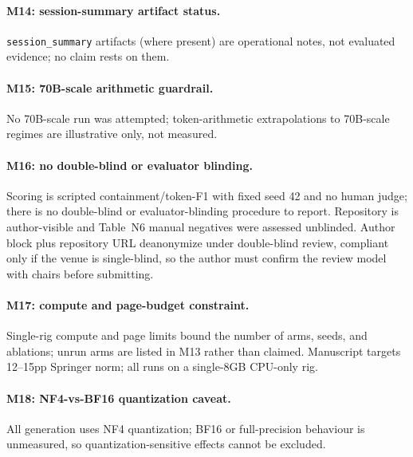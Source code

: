 \paragraph{M14: session-summary artifact status.}
\texttt{session\_summary} artifacts (where present) are operational notes, not evaluated evidence; no claim rests on them.

\paragraph{M15: 70B-scale arithmetic guardrail.}
No 70B-scale run was attempted; token-arithmetic extrapolations to 70B-scale regimes are illustrative only, not measured.

\paragraph{M16: no double-blind or evaluator blinding.}
Scoring is scripted containment/token-F1 with fixed seed 42 and no human judge; there is no double-blind or evaluator-blinding procedure to report.
Repository is author-visible and Table~N6 manual negatives were assessed unblinded.
Author block plus repository URL deanonymize under double-blind review, compliant only if the venue is single-blind, so the author must confirm the review model with chairs before submitting.

\paragraph{M17: compute and page-budget constraint.}
Single-rig compute and page limits bound the number of arms, seeds, and ablations; unrun arms are listed in M13 rather than claimed.
Manuscript targets 12--15pp Springer norm; all runs on a single-8GB CPU-only rig.

\paragraph{M18: NF4-vs-BF16 quantization caveat.}
All generation uses NF4 quantization; BF16 or full-precision behaviour is unmeasured, so quantization-sensitive effects cannot be excluded.

